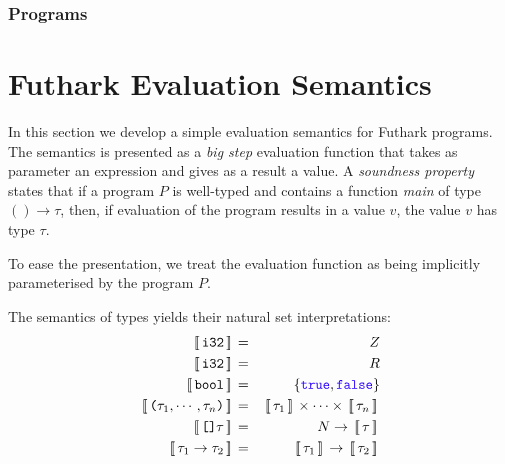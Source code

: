 \documentclass[oneside,11pt]{book}
\begin{document}


\subsubsection*{Programs }



\section{Futhark Evaluation Semantics}

In this section we develop a simple evaluation semantics for Futhark
programs. The semantics is presented as a \emph{big step} evaluation
function that takes as parameter an expression and gives as a result a
value. A \emph{soundness property} states that if a program $P$ is
well-typed and contains a function \emph{main} of type $() \rightarrow
\tau$, then, if evaluation of the program results in a value $v$, the
value $v$ has type $\tau$.

To ease the presentation, we treat the evaluation function as being
implicitly parameterised by the program $P$. %

\newcommand{\Eval}[1]{\,\sem{\,#1\,}\,}
\newcommand{\extractF}[1]{\langle\,#1\,\rangle}
\newcommand{\Let}{\mathrm{let}}
\newcommand{\Where}[1]{\mathrm{where} \begin{array}[t]{l} #1 \end{array}}
\newcommand{\In}{\mathrm{in}}
\newcommand{\N}{N}
\newcommand{\Z}{Z}
\newcommand{\R}{R}
The semantics of types yields their natural set interpretations:
\begin{eqnarray*}
  \Eval{\kw{i32}} & = & \Z \\
  \Eval{\kw{i32}} & = & \R \\
  \Eval{\kw{bool}} & = & \{\fop{true},\fop{false}\} \\
  \Eval{\kw{(}\tau_1,\cdots,\tau_n\kw{)}} & = & \Eval{\tau_1} \times \cdots \times \Eval{\tau_n} \\
  \Eval{\kw{[]}\tau} & = & \N \rightarrow \Eval{\tau} \\
  \Eval{\tau_1 \rightarrow \tau_2} & = & \Eval{\tau_1} \rightarrow \Eval{\tau_2}
\end{eqnarray*}
\end{document}
